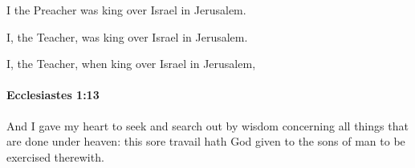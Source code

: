 			\begin{versebox}
					\item[BHS] 
					\item[LXX] 
					\item[ASV] I the Preacher was king over Israel in Jerusalem.
					\item[NIV] I, the Teacher, was king over Israel in Jerusalem.
					\item[NRSV] I, the Teacher, when king over Israel in Jerusalem,
			\end{versebox}

		\paragraph{Ecclesiastes 1:13} %
			\label{ECCLESIASTES-1-13}

			And I gave my heart to seek and search out by wisdom concerning all things that are done under heaven: this sore travail hath God given to the sons of man to be exercised therewith.

